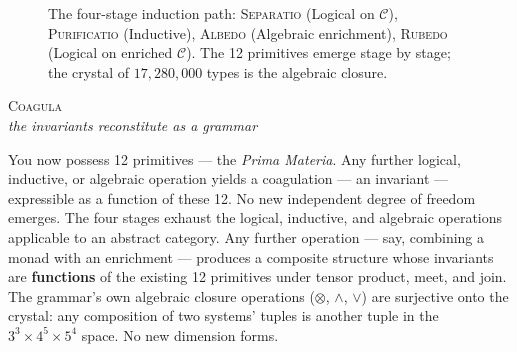 \documentclass[12pt,a4paper]{article}
\begin{document}
\begin{figure}[htbp]
{
}

\caption{The four-stage induction path: \textsc{Separatio} (Logical on $\mathcal{C}$), \textsc{Purificatio} (Inductive), \textsc{Albedo} (Algebraic enrichment), \textsc{Rubedo} (Logical on enriched $\mathcal{C}$). The 12 primitives emerge stage by stage; the crystal of $17{,}280{,}000$ types is the algebraic closure.}
\label{fig:induction-path}
\end{figure}

\begin{center}
\vspace{0.6em}
{\large\textsc{Coagula}}\\[4pt]
{\small\itshape the invariants reconstitute as a grammar}
\vspace{0.4em}
\end{center}

You now possess 12 primitives --- the \emph{Prima Materia}. Any further logical, inductive, or algebraic operation yields a coagulation --- an invariant --- expressible as a function of these 12. No new independent degree of freedom emerges. The four stages exhaust the logical, inductive, and algebraic operations applicable to an abstract category. Any further operation --- say, combining a monad with an enrichment --- produces a composite structure whose invariants are \textbf{functions} of the existing 12 primitives under tensor product, meet, and join. The grammar's own algebraic closure operations ($\otimes$, $\wedge$, $\vee$) are surjective onto the crystal: any composition of two systems' tuples is another tuple in the $3^3 \times 4^5 \times 5^4$ space. No new dimension forms.
\end{document}
